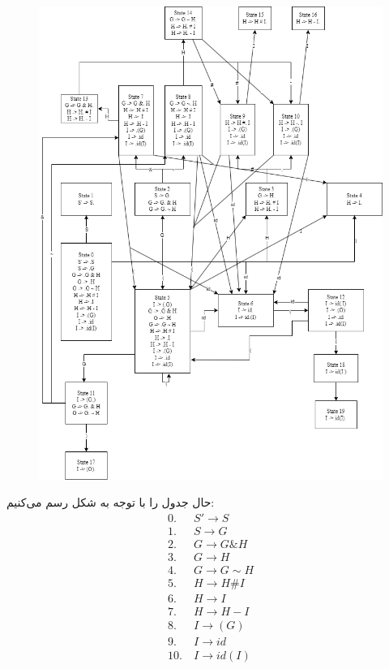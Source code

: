\documentclass[]{article}
\begin{document}
\begin{figure}[H]
    \centering
    \includegraphics[scale=0.6]{figure/6-table.png}
\end{figure}
حال جدول را با توجه به شکل رسم می‌کنیم:
\begin{align*}
0.&~S' \rightarrow S\\
1.&~S \rightarrow G\\
2.&~G \rightarrow G \& H \\
3.&~G \rightarrow H\\
4.&~G \rightarrow G \sim H\\
5.&~H \rightarrow H \# I\\
6.&~H \rightarrow I\\
7.&~H \rightarrow H - I\\
8.&~I \rightarrow ( G )\\
9.&~I \rightarrow id\\
10.&~I \rightarrow id ( I )\\
\end{align*}
\end{document}
